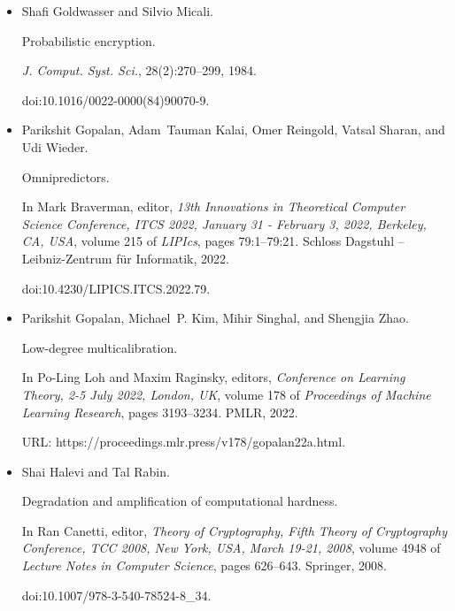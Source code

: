 \documentclass[10pt,a4paper]{article}
\begin{document}
\begin{itemize}
\item[] 
[6]

Shafi Goldwasser and Silvio Micali.


Probabilistic encryption.


\emph{J. Comput. Syst. Sci.}, 28(2):270–299, 1984.


doi:10.1016/0022-0000(84)90070-9.





\item[] 
[7]

Parikshit Gopalan, Adam Tauman Kalai, Omer Reingold, Vatsal Sharan, and Udi
Wieder.


Omnipredictors.


In Mark Braverman, editor, \emph{13th Innovations in Theoretical
Computer Science Conference, ITCS 2022, January 31 - February 3, 2022,
Berkeley, CA, USA}, volume 215 of \emph{LIPIcs}, pages 79:1–79:21. Schloss
Dagstuhl – Leibniz-Zentrum für Informatik, 2022.


doi:10.4230/LIPICS.ITCS.2022.79.





\item[] 
[8]

Parikshit Gopalan, Michael P. Kim, Mihir Singhal, and Shengjia Zhao.


Low-degree multicalibration.


In Po-Ling Loh and Maxim Raginsky, editors, \emph{Conference on
Learning Theory, 2-5 July 2022, London, UK}, volume 178 of \emph{Proceedings
of Machine Learning Research}, pages 3193–3234. PMLR, 2022.


URL: https://proceedings.mlr.press/v178/gopalan22a.html.





\item[] 
[9]

Shai Halevi and Tal Rabin.


Degradation and amplification of computational hardness.


In Ran Canetti, editor, \emph{Theory of Cryptography, Fifth Theory of
Cryptography Conference, TCC 2008, New York, USA, March 19-21, 2008},
volume 4948 of \emph{Lecture Notes in Computer Science}, pages 626–643.
Springer, 2008.


doi:10.1007/978-3-540-78524-8\_34.






\end{itemize}
\end{document}
